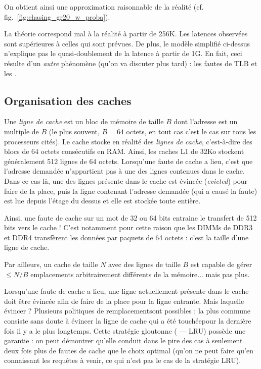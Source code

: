 On obtient ainsi une approximation raisonnable de la réalité
(cf. fig.~\ref{fig:chasing_gr20_w_proba}).

 \begin{ddanger}
   La théorie correspond mal à la réalité à partir de 256K. Les latences
   observées sont supérieures à celles qui sont prévues. De plus, le modèle
   simplifié ci-dessus n'explique pas le quasi-doublement de la latence à partir
   de 1G. En fait, ceci résulte d'un \emph{autre} phénomène (qu'on va discuter
   plus tard) : les fautes de TLB et les \og {}\fg.
 \end{ddanger}

\subsection{Organisation des caches}
\label{sec:cache_line}

Une \emph{ligne de cache} est un bloc de mémoire de taille $B$ dont l'adresse
est un multiple de $B$ (le plus souvent, $B=64$ octets, en tout cas c'est le cas
sur tous les processeurs cités). Le cache stocke en réalité des \emph{lignes de
  cache}, c'est-à-dire des blocs de 64 octets consécutifs en RAM. Ainsi, les
caches L1 de 32Ko stockent généralement 512 lignes de 64 octets. Lorsqu'une
faute de cache a lieu, c'est que l'adresse demandée n'appartient pas à une des
lignes contenues dans le cache. Dans ce cas-là, une des lignes présente dans le
cache est évincée (\emph{evicted}) pour faire de la place, puis la ligne
contenant l'adresse demandée (qui a causé la faute) est lue depuis l'étage du
dessus et elle est stockée toute entière.

Ainsi, une faute de cache sur un mot de 32 ou 64 bits entraine le transfert de
512 bits vers le cache ! C'est notamment pour cette raison que les DIMMs de DDR3
et DDR4 transfèrent les données par paquets de 64 octets : c'est la taille d'une
ligne de cache.

Par ailleurs, un cache de taille $N$ avec des lignes de taille $B$ est capable
de gérer $\leq N/B$ emplacements arbitrairement différents de la mémoire... mais
pas plus.

Lorsqu'une faute de cache a lieu, une ligne actuellement présente dans le cache
doit être évincée afin de faire de la place pour la ligne entrante. Mais
laquelle évincer ? Plusieurs \og politiques de remplacement\fg sont possibles ;
la plus commune consiste sans doute à évincer la ligne de cache qui a été \og
touchée\fg pour la dernière fois il y a le plus longtemps. Cette stratégie
gloutonne ( --- LRU) possède une garantie : on peut
démontrer qu'elle conduit dans le pire des cas à seulement deux fois plus de
fautes de cache que le choix optimal (qu'on ne peut faire qu'en connaissant les
requêtes à venir, ce qui n'est pas le cas de la stratégie LRU).

